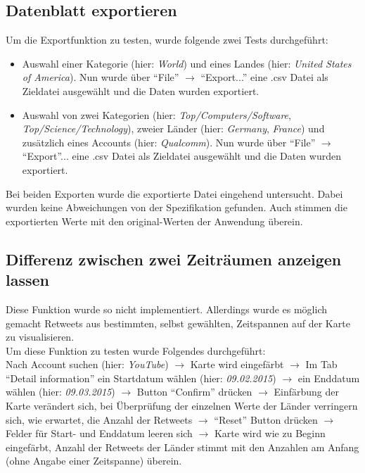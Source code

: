 \subsection{Datenblatt exportieren}
Um die Exportfunktion zu testen, wurde folgende zwei Tests durchgeführt:
\begin{itemize}
	\item Auswahl einer Kategorie (hier: \textit{World}) und eines Landes (hier: \textit{United States of America}). Nun wurde über "`File"' $\to$ "`Export..."' eine .csv Datei als Zieldatei ausgewählt und die Daten wurden exportiert.
	\item Auswahl von zwei Kategorien (hier: \textit{Top/Computers/Software}, \textit{Top/Science/Technology}), zweier Länder (hier: \textit{Germany}, \textit{France}) und zusätzlich eines Accounts (hier: \textit{Qualcomm}). Nun wurde über "`File"' $\to$ "`Export"'... eine .csv Datei als Zieldatei ausgewählt und die Daten wurden exportiert.
\end{itemize}
Bei beiden Exporten wurde die exportierte Datei eingehend untersucht. Dabei wurden keine Abweichungen von der Spezifikation gefunden. Auch stimmen die exportierten Werte mit den original-Werten der Anwendung überein.

\subsection{Differenz zwischen zwei Zeiträumen anzeigen lassen}
Diese Funktion wurde so nicht implementiert. Allerdings wurde es möglich gemacht Retweets aus bestimmten, selbst gewählten, Zeitspannen auf der Karte zu visualisieren.\\
Um diese Funktion zu testen wurde Folgendes durchgeführt:\\ Nach Account suchen (hier: \textit{YouTube}) $\to$ Karte wird eingefärbt $\to$ Im Tab "`Detail information"'  ein Startdatum wählen (hier: \textit{09.02.2015}) $\to$ ein Enddatum wählen (hier: \textit{09.03.2015}) $\to$ Button "`Confirm"' drücken $\to$ Einfärbung der Karte verändert sich, bei Überprüfung der einzelnen Werte der Länder verringern sich, wie erwartet, die Anzahl der Retweets $\to$ "`Reset"' Button drücken $\to$ Felder für Start- und Enddatum leeren sich $\to$ Karte wird wie zu Beginn eingefärbt, Anzahl der Retweets der Länder stimmt mit den Anzahlen am Anfang (ohne Angabe einer Zeitspanne) überein.
